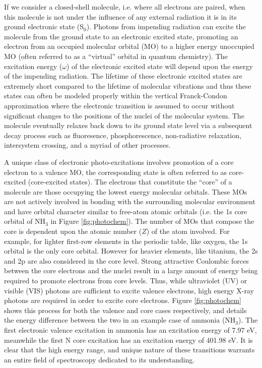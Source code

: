\documentclass{article}
\begin{document}
If we consider a closed-shell molecule, i.e. where all electrons are paired, when this molecule is not under the influence of any external radiation it is in its ground electronic state (S$_0$). Photons from impending radiation can excite the molecule from the ground state to an electronic excited state, promoting an electron from an occupied molecular orbital (MO) to a higher energy unoccupied MO (often referred to as a ``virtual'' orbital in quantum chemistry). The excitation energy ($\omega$) of the electronic excited state will depend upon the energy of the impending radiation. The lifetime of these electronic excited states are extremely short compared to the lifetime of molecular vibrations and thus these states can often be modeled properly within the vertical Franck-Condon approximation \cite{franck_elementary_1926,condon_theory_1926,condon_nuclear_1928,hazra_first_2004} where the electronic transition is assumed to occur without significant changes to the positions of the nuclei of the molecular system. The molecule eventually relaxes back down to its ground state level via a subsequent decay process such as fluoresence, \cite{maxwell_chlorophyll_2000,valeur_molecular_2012} phosphorescence, \cite{tanaka_observation_2005,romanovskii_phosphorescence_2000,cavar_fluorescence_2005} non-radiative relaxation, \cite{callomon_non-radiative_1972,de_mello_donega_non-radiative_1995} intersystem crossing, \cite{lamola_mechanisms_1965,hauser_intersystem_1991} and a myriad of other processes. \cite{zakrzewski_threshold_1984,meskers_relaxation_2000,vant_hof_zero-field_1976,hors_cross-relaxation_1982}

A unique class of electronic photo-excitations involves promotion of a core electron to a valence MO, the corresponding state is often referred to as core-excited (core-excited states). The electrons that constitute the ``core'' of a molecule are those occupying the lowest energy molecular orbitals. These MOs are not actively involved in bonding with the surrounding molecular environment and have orbital character similar to free-atom atomic orbitals (i.e. the 1s core orbital of NH$_3$ in Figure \ref{fig:photochem}). The number of MOs that compose the core is dependent upon the atomic number ($Z$) of the atom involved. For example, for lighter first-row elements in the periodic table, like oxygen, the 1s orbital is the only core orbital. However for heavier elements, like titanium, the 2s and 2p are also considered in the core level. Strong attractive Coulombic forces between the core electrons and the nuclei result in a large amount of energy being required to promote electrons from core levels. Thus, while ultraviolet (UV) or visible (VIS) photons are sufficient to excite valence electrons, high energy X-ray photons are required in order to excite core electrons. Figure \ref{fig:photochem} shows this process for both the valence and core cases respectively, and details the energy difference between the two in an example case of ammonia (NH$_3$). The first electronic valence excitation in ammonia has an excitation energy of 7.97 eV, meanwhile the first N core excitation has an excitation energy of 401.98 eV. It is clear that the high energy range, and unique nature of these transitions warrants an entire field of spectroscopy dedicated to its understanding.
\end{document}
